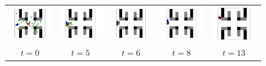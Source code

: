 \documentclass[letterpaper]{article} %
\begin{document}
\begin{figure}[!htb]
	\centering
	\begin{tabular}{ccccc}
		\includegraphics[width=0.18\linewidth]{figs/173/0.pdf} &
		\includegraphics[width=0.18\linewidth]{figs/173/5.pdf} &
		\includegraphics[width=0.18\linewidth]{figs/173/6.pdf} &
		\includegraphics[width=0.18\linewidth]{figs/173/8.pdf} &
		\includegraphics[width=0.18\linewidth]{figs/173/13.pdf} \\
		$t=0$ & $t=5$ & $t=6$ & $t=8$ & $t=13$
	\end{tabular}
\end{figure}
\end{document}
